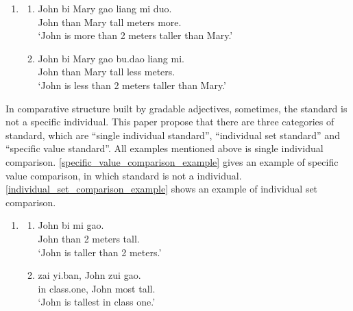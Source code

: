 \documentclass{ctexart}
\begin{document}
\begin{enumerate}
    \item
    \begin{enumerate}
        \item \label{dp_value_big_vague_example}
        John \enspace bi \enspace Mary \enspace gao \enspace liang mi \enspace \enspace duo.\\
        John than Mary \enspace tall  meters \enspace more. \\
        `John is more than 2 meters taller than Mary.'

        \item \label{dp_value_small_vague_example}
        John \enspace bi \enspace Mary \enspace gao \enspace bu.dao \enspace liang mi.\\
        John than Mary \enspace tall \enspace \enspace less \enspace \enspace {} meters. \\
        `John is less than 2 meters taller than Mary.'
    \end{enumerate}
\end{enumerate}

In comparative structure built by gradable adjectives, sometimes, the standard is not a specific individual. This paper propose that there are three categories of standard, which are ``single individual standard'', ``individual set standard'' and ``specific value standard''. All examples mentioned above is single individual comparison. \ref{specific_value_comparison_example} gives an example of specific value comparison, in which standard is not a individual. \ref{individual_set_comparison_example} shows an example of individual set comparison.

\begin{enumerate}
    \item
    \begin{enumerate}
        \item \label{specific_value_comparison_example}
        John \enspace bi \enspace {} mi \enspace \enspace \enspace gao.\\
        John than 2 meters \enspace tall. \\
        `John is taller than 2 meters.'

        \item \label{individual_set_comparison_example}
        zai \enspace yi.ban, \enspace John zui \enspace gao.\\
        in \enspace class.one, John most tall.\\
        `John is tallest in class one.'

    \end{enumerate}
\end{enumerate}
\end{document}
